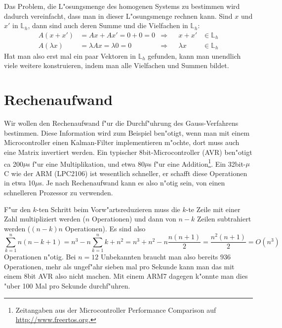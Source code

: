 Das Problem, die L"osungsmenge des homogenen Systems zu bestimmen wird
dadurch vereinfacht, dass man in dieser L"osungsmenge rechnen kann.
Sind $x$ und $x'$  in $\mathbb L_h$, dann sind auch deren Summe und
die Vielfachen in $\mathbb L_h$:
\begin{align*}
A(x+x')&=Ax+Ax'=0+0=0&\Rightarrow&&x+x'&\in\mathbb L_h\\
A(\lambda x)&=\lambda Ax=\lambda 0=0&\Rightarrow&&\lambda x&\in \mathbb L_h
\end{align*}
Hat man also erst mal ein paar Vektoren in $\mathbb L_h$ gefunden, kann
man unendlich viele weitere konstruieren, indem man alle Vielfachen und Summen
bildet.

\section{Rechenaufwand}
Wir wollen den Rechenaufwand f"ur die Durchf"uhrung des Gauss-Verfahrens
bestimmen.
Diese Information wird zum Beispiel ben"otigt, wenn man mit
einem Microcontroller einen Kalman-Filter implementieren m"ochte, dort
muss auch eine Matrix invertiert werden.
Ein typischer 8bit-Microcontroller (AVR)
ben"otigt ca 200$\mu$s f"ur eine Multiplikation, und etwa 80$\mu$s f"ur
eine Addition\footnote{Zeitangaben aus der Microcontroller Performance
Comparison auf \url {http://www.freertos.org.}}.
Ein 32bit-$\mu$C wie der ARM (LPC2106) ist wesentlich schneller,
er schafft diese Operationen in etwa 10$\mu$s.
Je nach Rechenaufwand kann
es also n"otig sein, von einen schnelleren Prozessor zu verwenden.

F"ur den $k$-ten Schritt beim Vorw"artsreduzieren muss die $k$-te
Zeile mit einer Zahl multipliziert werden ($n$ Operationen) und dann
von $n-k$ Zeilen subtrahiert werden ($(n-k)n$ Operationen).
Es sind also
\[
\sum_{k=1}^n n(n-k+1) = n^3 - n \sum_{k=1}^n k + n^2
=n^3+n^2-n\frac{n(n+1)}2=\frac{n^2(n+1)}2 =O(n^3)
\]
Operationen n"otig.
Bei $n=12$ Unbekannten braucht man also bereits
$936$ Operationen, mehr als ungef"ahr sieben mal pro Sekunde kann man das mit
einem 8bit AVR also nicht machen.
Mit einem ARM7 dagegen k"onnte
man dies "uber 100 Mal pro Sekunde durchf"uhren.

